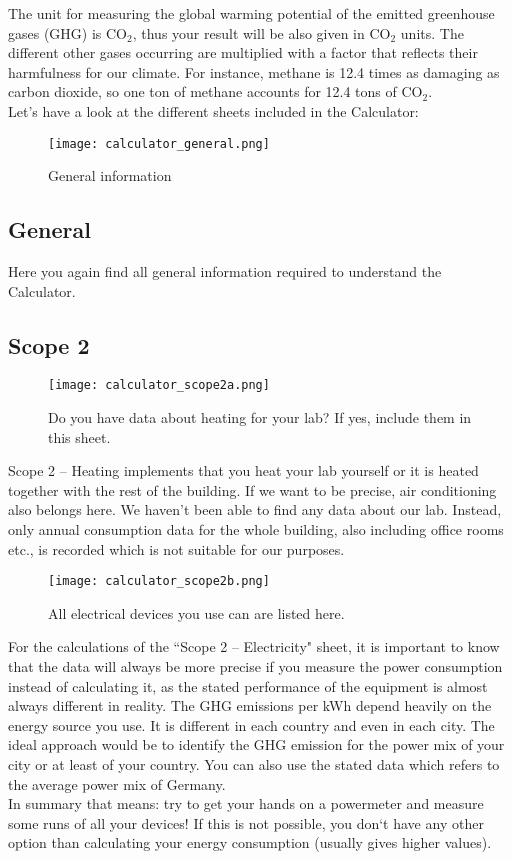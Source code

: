 The unit for measuring the global warming potential of the emitted greenhouse gases (GHG) is CO$_2$, thus your result will be also given in CO$_2$ units. The different other gases occurring are multiplied with a factor that reflects their harmfulness for our climate. For instance, methane is 12.4 times as damaging as carbon dioxide, so one ton of methane accounts for 12.4 tons of CO$_2$. \\
Let’s have a look at the different sheets included in the Calculator:

\begin{wrapfigure}{r}{8cm}
	\centering
	\texttt{[image: calculator\_general.png]}%
	\caption{General information}%
\end{wrapfigure}

\subsection{General}

Here you again find all general information required to understand the Calculator. 

\subsection{Scope 2}
\begin{wrapfigure}{r}{8cm}
	\centering
	\texttt{[image: calculator\_scope2a.png]}%
	\caption{Do you have data about heating for your lab? If yes, include them in this sheet.}%
\end{wrapfigure}

Scope 2 – Heating implements that you heat your lab yourself or it is heated together with the rest of the building. If we want to be precise, air conditioning also belongs here. We haven’t been able to find any data about our lab. Instead, only annual consumption data for the whole building, also including office rooms etc., is recorded which is not suitable for our purposes.
\begin{wrapfigure}{r}{8cm}
	\centering
	\texttt{[image: calculator\_scope2b.png]}%
	\caption{All electrical devices you use can are listed here.}%
\end{wrapfigure}


For the calculations of the “Scope 2 – Electricity" sheet, it is important to know that the data will always be more precise if you measure the power consumption instead of calculating it, as the stated performance of the equipment is almost always different in reality. The GHG emissions per kWh depend heavily on the energy source you use. It is different in each country and even in each city. The ideal approach would be to identify the GHG emission for the power mix of your city or at least of your country. You can also use the stated data which refers to the average power mix of Germany.\\
In summary that means: try to get your hands on a powermeter and measure some runs of all your devices! If this is not possible, you don`t have any other option than calculating your energy consumption (usually gives higher values). 

